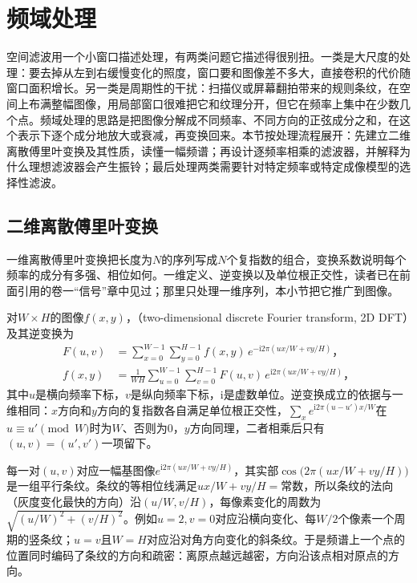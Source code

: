 \section{频域处理}
\label{sec:vision-transforms-frequency}

空间滤波用一个小窗口描述处理，有两类问题它描述得很别扭。一类是大尺度的处理：要去掉从左到右缓慢变化的照度，窗口要和图像差不多大，直接卷积的代价随窗口面积增长。另一类是周期性的干扰：扫描仪或屏幕翻拍带来的规则条纹，在空间上布满整幅图像，用局部窗口很难把它和纹理分开，但它在频率上集中在少数几个点。频域处理的思路是把图像分解成不同频率、不同方向的正弦成分之和，在这个表示下逐个成分地放大或衰减，再变换回来。本节按处理流程展开：先建立二维离散傅里叶变换及其性质，读懂一幅频谱；再设计逐频率相乘的滤波器，并解释为什么理想滤波器会产生振铃；最后处理两类需要针对特定频率或特定成像模型的选择性滤波。

\subsection{二维离散傅里叶变换}
\label{sec:vision-transforms-dft2d}

一维离散傅里叶变换把长度为$N$的序列写成$N$个复指数的组合，变换系数说明每个频率的成分有多强、相位如何。一维定义、逆变换以及单位根正交性，读者已在前面引用的卷一“信号”章中见过；那里只处理一维序列，本小节把它推广到图像。

对$W\times H$的图像$f(x,y)$，（two-dimensional discrete Fourier transform, 2D DFT）及其逆变换为
\begin{align}
  F(u,v)&=\sum_{x=0}^{W-1}\sum_{y=0}^{H-1}f(x,y)\,
  e^{-\mathrm{i}2\pi(ux/W+vy/H)}\text{，}
  \label{eq:vision-transforms-dft2d}\\
  f(x,y)&=\frac{1}{WH}\sum_{u=0}^{W-1}\sum_{v=0}^{H-1}F(u,v)\,
  e^{\mathrm{i}2\pi(ux/W+vy/H)}\text{，}
  \label{eq:vision-transforms-idft2d}
\end{align}
其中$u$是横向频率下标，$v$是纵向频率下标，$\mathrm{i}$是虚数单位。逆变换成立的依据与一维相同：$x$方向和$y$方向的复指数各自满足单位根正交性，$\sum_xe^{\mathrm{i}2\pi(u-u')x/W}$在$u\equiv u'\pmod W$时为$W$、否则为0，$y$方向同理，二者相乘后只有$(u,v)=(u',v')$一项留下。

每一对$(u,v)$对应一幅基图像$e^{\mathrm{i}2\pi(ux/W+vy/H)}$，其实部$\cos\bigl(2\pi(ux/W+vy/H)\bigr)$是一组平行条纹。条纹的等相位线满足$ux/W+vy/H=$常数，所以条纹的法向（灰度变化最快的方向）沿$(u/W,v/H)$，每像素变化的周数为$\sqrt{(u/W)^2+(v/H)^2}$。例如$u=2,v=0$对应沿横向变化、每$W/2$个像素一个周期的竖条纹；$u=v$且$W=H$对应沿对角方向变化的斜条纹。于是频谱上一个点的位置同时编码了条纹的方向和疏密：离原点越远越密，方向沿该点相对原点的方向。

